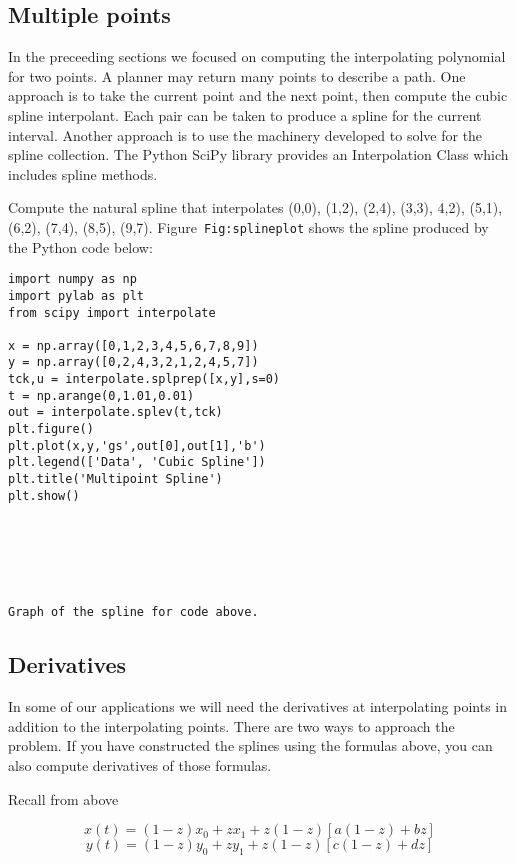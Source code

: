 \hypertarget{multiple-points}{%
\subsection{Multiple points}\label{multiple-points}}

In the preceeding sections we focused on computing the interpolating
polynomial for two points. A planner may return many points to describe
a path. One approach is to take the current point and the next point,
then compute the cubic spline interpolant. Each pair can be taken to
produce a spline for the current interval. Another approach is to use
the machinery developed to solve for the spline collection. The Python
SciPy library provides an Interpolation Class which includes spline
methods.

Compute the natural spline that interpolates (0,0), (1,2), (2,4), (3,3),
4,2), (5,1), (6,2), (7,4), (8,5), (9,7). Figure~\texttt{Fig:splineplot}
shows the spline produced by the Python code below:

\hypertarget{lst:spline2}{%
\label{lst:spline2}}%
\begin{verbatim}
import numpy as np
import pylab as plt
from scipy import interpolate

x = np.array([0,1,2,3,4,5,6,7,8,9])
y = np.array([0,2,4,3,2,1,2,4,5,7])
tck,u = interpolate.splprep([x,y],s=0)
t = np.arange(0,1.01,0.01)
out = interpolate.splev(t,tck)
plt.figure()
plt.plot(x,y,'gs',out[0],out[1],'b')
plt.legend(['Data', 'Cubic Spline'])
plt.title('Multipoint Spline')
plt.show()






Graph of the spline for code above.
\end{verbatim}

\hypertarget{derivatives}{%
\subsection{Derivatives}\label{derivatives}}

In some of our applications we will need the derivatives at
interpolating points in addition to the interpolating points. There are
two ways to approach the problem. If you have constructed the splines
using the formulas above, you can also compute derivatives of those
formulas.

Recall from above

\[x(t) = (1-z)x_0 + z x_1 + z(1-z)\left[ a(1-z) +b z\right]\]\[y(t) = (1-z)y_0 + z y_1 + z(1-z)\left[ c(1-z) +d z\right]\]

